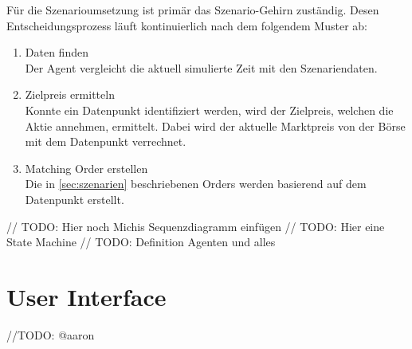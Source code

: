 Für die Szenarioumsetzung ist primär das Szenario-Gehirn zuständig. Desen Entscheidungsprozess läuft kontinuierlich nach dem folgendem Muster ab:
\begin{enumerate}
    \item Daten finden\\
        Der Agent vergleicht die aktuell simulierte Zeit mit den Szenariendaten.
    \item Zielpreis ermitteln\\
        Konnte ein Datenpunkt identifiziert werden, wird der Zielpreis, welchen die Aktie annehmen, ermittelt. Dabei wird der aktuelle Marktpreis von der Börse mit dem Datenpunkt verrechnet.
    \item Matching Order erstellen\\
        Die in \autoref{sec:szenarien} beschriebenen Orders werden basierend auf dem Datenpunkt erstellt.
\end{enumerate}


// TODO: Hier noch Michis Sequenzdiagramm einfügen
// TODO: Hier eine State Machine
// TODO: Definition Agenten und alles 

\section{User Interface}
//TODO: @aaron
